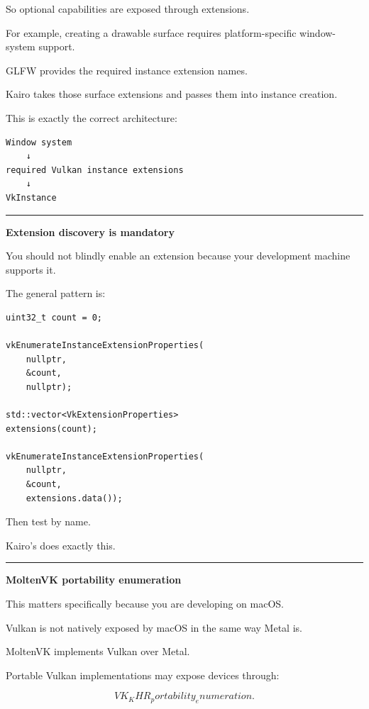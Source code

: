 So optional capabilities are exposed through extensions.

For example, creating a drawable surface requires platform-specific window-system support.

GLFW provides the required instance extension names.

Kairo takes those surface extensions and passes them into instance creation.

This is exactly the correct architecture:

\begin{verbatim}
Window system
    ↓
required Vulkan instance extensions
    ↓
VkInstance
\end{verbatim}

\begin{center}\rule{0.5\linewidth}{0.5pt}\end{center}

\textbf{Extension discovery is mandatory}

You should not blindly enable an extension because your development machine supports it.

The general pattern is:

\begin{verbatim}
uint32_t count = 0;

vkEnumerateInstanceExtensionProperties(
    nullptr,
    &count,
    nullptr);

std::vector<VkExtensionProperties>
extensions(count);

vkEnumerateInstanceExtensionProperties(
    nullptr,
    &count,
    extensions.data());
\end{verbatim}

Then test by name.

Kairo's  does exactly this.

\begin{center}\rule{0.5\linewidth}{0.5pt}\end{center}

\textbf{MoltenVK portability enumeration}

This matters specifically because you are developing on macOS.

Vulkan is not natively exposed by macOS in the same way Metal is.

MoltenVK implements Vulkan over Metal.

Portable Vulkan implementations may expose devices through:

\[
VK_KHR_portability_enumeration.
\]

